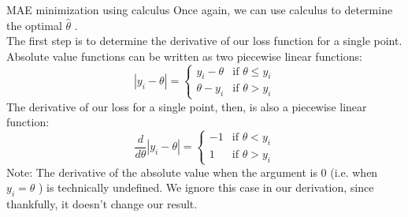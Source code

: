 \documentclass[aspectratio=169]{../latex_main/tntbeamer}  %
\begin{document}
	
	\begin{frame}{MAE minimization using calculus}
	    Once again, we can use calculus to determine the optimal  $\hat{\theta}$   .\\
        The first step is to determine the derivative of our loss function for a single point. Absolute value functions can be written as two piecewise linear functions:
        \begin{equation*}
            |y_i - \theta|  = \left\{\begin{array}{cc}
                y_i  - \theta & \text{if }\theta \leq y_i\\
               \theta - y_i  & \text{if } \theta > y_i
            \end{array}\right.
        \end{equation*}
        The derivative of our loss for a single point, then, is also a piecewise linear function:
        \begin{equation*}
            \frac{d}{d\theta}|y_i - \theta| = \left\{\begin{array}{cc}
               -1 & \text{if }\theta < y_i\\
              1  & \text{if } \theta > y_i
            \end{array}\right.
        \end{equation*}
        Note: The derivative of the absolute value when the argument is 0 (i.e. when          $y_i = \theta$   ) is technically undefined. We ignore this case in our derivation, since thankfully, it doesn’t change our result.      

	\end{frame}
	
	
	
\end{document}
